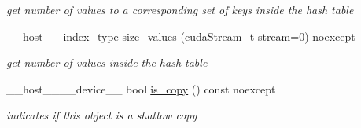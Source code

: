 \begin{DoxyCompactItemize}
\begin{DoxyCompactList}\small\item\em get number of values to a corresponding set of keys inside the hash table \end{DoxyCompactList}\item 
\+\_\+\+\_\+host\+\_\+\+\_\+ index\+\_\+type \hyperlink{classwarpcore_1_1MultiValueHashTable_a2f663ba48c0399e0821293c17cef1c34}{size\+\_\+values} (cuda\+Stream\+\_\+t stream=0) noexcept
\begin{DoxyCompactList}\small\item\em get number of values inside the hash table \end{DoxyCompactList}\item 
\+\_\+\+\_\+host\+\_\+\+\_\+\+\_\+\+\_\+device\+\_\+\+\_\+ bool \hyperlink{classwarpcore_1_1MultiValueHashTable_a12d253dd2b4cbbdefe56944b16268f8d}{is\+\_\+copy} () const noexcept
\begin{DoxyCompactList}\small\item\em indicates if this object is a shallow copy \end{DoxyCompactList}\end{DoxyCompactItemize}
